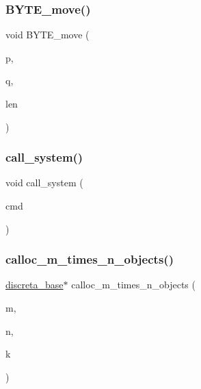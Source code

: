 \mbox{\label{global_8_c_a571e02764df3be35121dd9b590fe0484}} 
\subsubsection{\texorpdfstring{B\+Y\+T\+E\+\_\+move()}{BYTE\_move()}}
{\footnotesize\ttfamily void B\+Y\+T\+E\+\_\+move (\begin{DoxyParamCaption}\item[{\mbox{\hyperlink{galois_8h_ab6cc7b4aeb6ea31aba2b3fbfc83ff5e6}{B\+Y\+TE}} $\ast$}]{p,  }\item[{\mbox{\hyperlink{galois_8h_ab6cc7b4aeb6ea31aba2b3fbfc83ff5e6}{B\+Y\+TE}} $\ast$}]{q,  }\item[{\mbox{\hyperlink{galois_8h_a09fddde158a3a20bd2dcadb609de11dc}{I\+NT}}}]{len }\end{DoxyParamCaption})}

\mbox{\label{global_8_c_a11294156aedd7726f626da3726fee784}} 
\subsubsection{\texorpdfstring{call\+\_\+system()}{call\_system()}}
{\footnotesize\ttfamily void call\+\_\+system (\begin{DoxyParamCaption}\item[{\mbox{\hyperlink{galois_8h_ab6cc7b4aeb6ea31aba2b3fbfc83ff5e6}{B\+Y\+TE}} $\ast$}]{cmd }\end{DoxyParamCaption})}

\mbox{\label{global_8_c_a7ec05b06a4e54352bb87806136eb485e}} 
\subsubsection{\texorpdfstring{calloc\+\_\+m\+\_\+times\+\_\+n\+\_\+objects()}{calloc\_m\_times\_n\_objects()}}
{\footnotesize\ttfamily \mbox{\hyperlink{classdiscreta__base}{discreta\+\_\+base}}$\ast$ calloc\+\_\+m\+\_\+times\+\_\+n\+\_\+objects (\begin{DoxyParamCaption}\item[{\mbox{\hyperlink{galois_8h_a09fddde158a3a20bd2dcadb609de11dc}{I\+NT}}}]{m,  }\item[{\mbox{\hyperlink{galois_8h_a09fddde158a3a20bd2dcadb609de11dc}{I\+NT}}}]{n,  }\item[{\mbox{\hyperlink{discreta_8h_aaf25ee7e2306d78c74ec7bc48f092e81}{kind}}}]{k }\end{DoxyParamCaption})}

